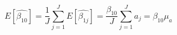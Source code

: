 \begin{equation}
\label{avgest}
E[\hat{\beta_{10}}] = \frac{1}{J}\sum\limits_{j=1}^J{E[\hat{\beta_{1j}}]} = \frac{\beta_{10}}{J}\sum\limits_{j=1}^J{a_j} = \beta_{10}\mu_{a}
\end{equation}